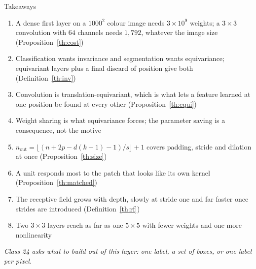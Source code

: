 \documentclass[aspectratio=169, 11pt]{beamer}
\newcommand{\bridge}[1]{%
  {\scriptsize\itshape\color{mcMuted} #1\par}\vspace{0.35em}}
\begin{document}
\begin{frame}{Takeaways}
  \vspace{-0.05em}
  {\scriptsize
  \begin{enumerate}\itemsep0.30em
    \item A dense first layer on a $1000^2$ colour image needs
          $3 \times 10^9$ weights; a $3\times3$ convolution with $64$
          channels needs $1{,}792$, whatever the image size
          (Proposition~\ref{th:cost})
    \item Classification wants invariance and segmentation wants
          equivariance; equivariant layers plus a final discard of
          position give both (Definition~\ref{th:inv})
    \item Convolution is translation-equivariant, which is what lets a
          feature learned at one position be found at every other
          (Proposition~\ref{th:equi})
    \item Weight sharing is what equivariance forces; the parameter
          saving is a consequence, not the motive
    \item $n_{\mathrm{out}} = \lfloor (n + 2p - d(k-1) - 1)/s \rfloor + 1$
          covers padding, stride and dilation at once
          (Proposition~\ref{th:size})
    \item A unit responds most to the patch that looks like its own
          kernel (Proposition~\ref{th:matched})
    \item The receptive field grows with depth, slowly at stride one and
          far faster once strides are introduced
          (Definition~\ref{th:rf})
    \item Two $3\times3$ layers reach as far as one $5\times5$ with
          fewer weights and one more nonlinearity
  \end{enumerate}}
  \bridge{Class 24 asks what to build out of this layer: one label, a
  set of boxes, or one label per pixel.}
\end{frame}
\end{document}
